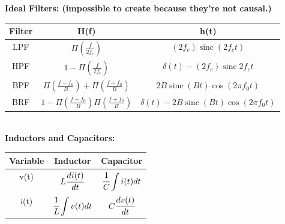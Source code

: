 \documentclass[10pt]{article}
\newcommand{\sect}[1]{\noindent\textbf{#1}\\}
\newcommand{\nin}{\noindent}
\DeclareMathOperator{\sinc}{sinc}
\begin{document}
\begin{ssmall}
\begin{multicols*}{2}
	\sect{Ideal Filters: {\tiny(impossible to create because they're not causal.)}}
	\nin \begin{tabular}{|c|c|c|}
		\hline
		Filter & H(f) & h(t) \\ \hline
		LPF & $\Pi \left(\frac{f}{2f_c}\right)$ & $(2 f_c) \sinc(2 f_c t)$ \\ \hline
		HPF & $1 - \Pi \left(\frac{f}{2f_c}\right)$ & $\delta(t) - (2f_c) \sinc{2f_ct}$ \\ \hline
		BPF & $\Pi\left(\frac{f-f_0}{B}\right) + \Pi\left(\frac{f+f_0}{B}\right)$ & $2B\sinc(Bt)\cos(2\pi f_0 t)$ \\ \hline
		BRF & $1-\Pi\left(\frac{f-f_0}{B}\right)  \Pi\left(\frac{f+f_0}{B}\right)$ & $\delta(t) - 2B\sinc(Bt)\cos(2\pi f_0 t)$ \\ \hline
	\end{tabular}\\

	\sect{Inductors and Capacitors:}
	\nin \begin{tabular}{|c|c|c|}
		\hline
		Variable & Inductor & Capacitor \\ \hline
		v(t) & $L \cfrac{di(t)}{dt}$ & $\cfrac{1}{C}\displaystyle\int i(t) dt$ \\ \hline
		i(t) & $\cfrac{1}{L}\displaystyle\int v(t) dt$ & $C \cfrac{d v(t)}{dt}$ \\ \hline
	\end{tabular}

	\end{multicols*}
	\end{ssmall}
\end{document}
